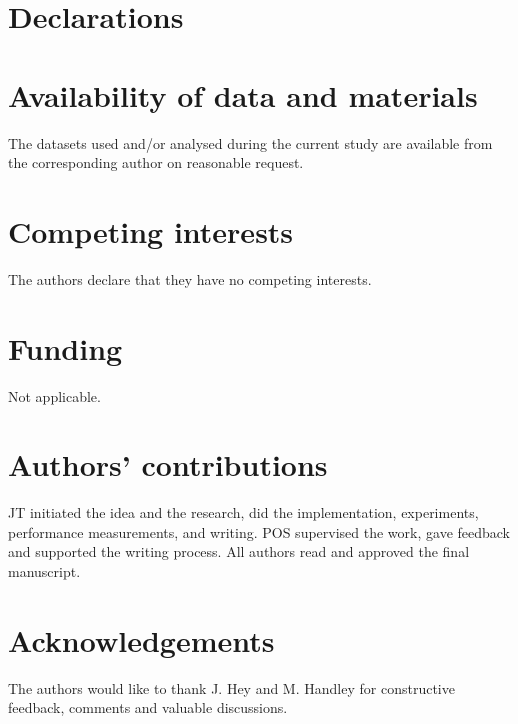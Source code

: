 \documentclass{bmcart}
\begin{document}




\begin{backmatter}


\section*{Declarations}
\section*{Availability of data and materials}
The datasets used and/or analysed during the current study are available from the corresponding author on reasonable request.

\section*{Competing interests}
The authors declare that they have no competing interests.

\section*{Funding}
Not applicable.

\section*{Authors' contributions}
JT initiated the idea and the research, did the implementation, experiments, performance measurements, and writing. POS supervised the work, gave feedback and supported the writing process. All authors read and approved the final manuscript.

\section*{Acknowledgements}
The authors would like to thank J. Hey and M. Handley for constructive feedback, comments and valuable discussions.


\end{backmatter}
\end{document}
